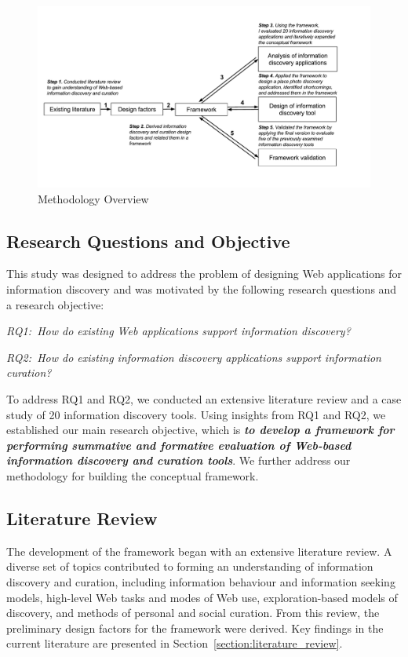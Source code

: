 \documentclass{sigchi}
\begin{document}
\begin{figure}
	\noindent
	\centering
    \includegraphics[width=2\columnwidth]{figures/methodology.pdf}
	\caption{Methodology Overview}
	\label{fig:methodology} 
\end{figure}

{\subsection{Research Questions and Objective}
This study was designed to address the problem of designing Web applications for information discovery and was motivated by the following research questions and a research objective:

\emph{RQ1:~How do existing Web applications support information discovery?}

\emph{RQ2:~How do existing information discovery applications support information curation?}

To address RQ1 and RQ2, we conducted an extensive literature review and a case study of 20 information discovery tools. Using insights from RQ1 and RQ2, we established our main research objective, which is \emph{\textbf{to develop a framework for performing summative and formative evaluation of Web-based information discovery and curation tools}}. We further address our methodology for building the conceptual framework.

}%

{\subsection{Literature Review}
\label{subsection:lit_review}
The development of the framework began with an extensive literature review. A diverse set of topics contributed to forming an understanding of information discovery and curation, including information behaviour and information seeking models, high-level Web tasks and modes of Web use, exploration-based models of discovery, and methods of personal and social curation. From this review, the preliminary design factors for the framework were derived. Key findings in the current literature are presented in Section~\ref{section:literature_review}.
}%
\end{document}
